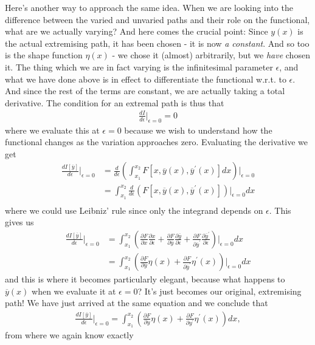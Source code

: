 \documentclass[a4paper]{article}
\begin{document}
    Here's another way to approach the same idea. When we are looking into the difference between the varied and unvaried paths and their role on the functional, what are we actually varying? And here comes the crucial point: Since \(y(x)\) is the actual extremising path, it has been chosen - it is now \textit{a constant}. And so too is the shape function \(\eta (x)\) - we chose it (almost) arbitrarily, but we \textit{have} chosen it. The thing which we are in fact varying is the infinitesimal parameter \(\epsilon\), and what we have done above is in effect to differentiate the functional w.r.t. to \(\epsilon\). And since the rest of the terms are constant, we are actually taking a total derivative. The condition for an extremal path is thus that 
    \begin{align*}
        \frac{dI}{d\epsilon }\biggr|_{\epsilon = 0} = 0
    \end{align*} 
    where we evaluate this at \(\epsilon = 0\) because we wish to understand how the functional changes as the variation approaches zero. Evaluating the derivative we get
    \begin{align*}
        \frac{dI[\overline{y}]}{d\epsilon }\biggr|_{\epsilon = 0} &= \frac{d}{d\epsilon } \left( \int_{x_1}^{x_2} F \left[ x, \overline{y}(x), \overline{y}^{\prime} (x) \right] dx \right)\biggr|_{\epsilon = 0}\\
        &= \int _{x_1}^{x_2} \frac{d}{d\epsilon } \left( F \left[ x, \overline{y}(x), \overline{y}^{\prime} (x) \right] \right)\biggr|_{\epsilon = 0} dx \\
    \end{align*}
    where we could use Leibniz' rule since only the integrand depends on \(\epsilon\). This gives us \begin{align*}
        \frac{dI[\overline{y}]}{d\epsilon }\biggr|_{\epsilon = 0} &= \int _{x_1}^{x_2} \left( \frac{\partial F}{\partial x} \frac{\partial x}{\partial \epsilon } + \frac{\partial F}{\partial \overline{y}}\frac{\partial \overline{y}}{\partial \epsilon } + \frac{\partial F}{\partial \overline{y}^{\prime} } \frac{\partial \overline{y}^{\prime} }{\partial \epsilon }\right)\biggr|_{\epsilon = 0} dx\\
        &= \int _{x_1}^{x_2} \left(\frac{\partial F}{\partial \overline{y}}\eta(x) + \frac{\partial F}{\partial \overline{y}^{\prime} } \eta^{\prime} (x)\right)\biggr|_{\epsilon = 0} dx
    \end{align*}  
    and this is where it becomes particularly elegant, because what happens to \(\overline{y}(x)\) when we evaluate it at \(\epsilon  = 0\)? It's just becomes our original, extremising path! We have just arrived at the same equation and we conclude that \begin{align*}
        \frac{dI[\overline{y}]}{d\epsilon }\biggr|_{\epsilon = 0} = \int _{x_1}^{x_2} \left(\frac{\partial F}{\partial y}\eta(x) + \frac{\partial F}{\partial y^{\prime}} \eta^{\prime} (x)\right) dx,
    \end{align*}
    from where we again know exactly 
\end{document}
